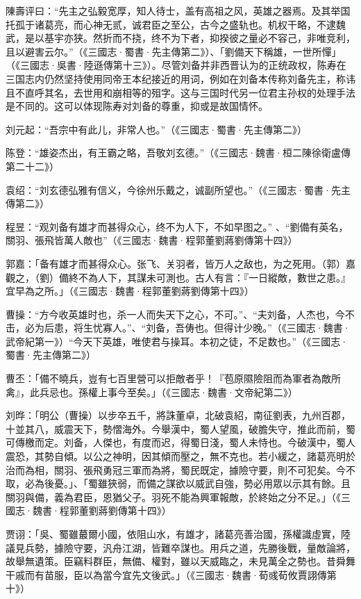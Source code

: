 陳壽评曰：“先主之弘毅宽厚，知人待士，盖有高祖之风，英雄之器焉。及其举国托孤于诸葛亮，而心神无贰，诚君臣之至公，古今之盛轨也。机权干略，不逮魏武，是以基宇亦狭。然折而不挠，终不为下者，抑揆彼之量必不容己，非唯竞利，且以避害云尔。”（《三國志·蜀書·先主傳第二》）、「劉備天下稱雄，一世所憚」（《三國志·吳書·陸遜傳第十三》）。尽管刘备并非西晋认为的正统政权，陈寿在三国志内仍然坚持使用同帝王本纪接近的用词，例如在刘备本传称刘备先主，称讳且不直呼其名，去世用和崩相等的殂字。这与三国时代另一位君主孙权的处理手法是不同的。这可以体现陈寿对刘备的尊重，抑或是故国情怀。

刘元起：“吾宗中有此儿，非常人也。”（《三國志·蜀書·先主傳第二》）

陈登：“雄姿杰出，有王霸之略，吾敬刘玄德。”（《三國志·魏書·桓二陳徐衛盧傳第二十二》）

袁绍：“刘玄德弘雅有信义，今徐州乐戴之，诚副所望也。”（《三國志·蜀書·先主傳第二》）

程昱：“观刘备有雄才而甚得众心，终不为人下，不如早图之。” 、“劉備有英名，關羽、張飛皆萬人敵也”（《三國志·魏書·程郭董劉蔣劉傳第十四》）

郭嘉：「备有雄才而甚得众心。张飞、关羽者，皆万人之敌也，为之死用。（郭）嘉觀之，（劉）備終不為人下，其謀未可測也。古人有言：『一日縱敵，數世之患。』宜早為之所。」（《三國志·魏書·程郭董劉蔣劉傳第十四》）

曹操：“方今收英雄时也，杀一人而失天下之心，不可。”、“夫刘备，人杰也，今不击，必为后患，将生忧寡人。”、“刘备，吾俦也。但得计少晚。”（《三國志·魏書·武帝紀第一》）“今天下英雄，唯使君与操耳。本初之徒，不足数也。”（《三國志·蜀書·先主傳第二》）

曹丕：「備不曉兵，豈有七百里營可以拒敵者乎！『苞原隰險阻而為軍者為敵所禽』，此兵忌也。孫權上事今至矣。」（《三國志·魏書·文帝紀第二》）

刘晔：「明公（曹操）以步卒五千，將誅董卓，北破袁紹，南征劉表，九州百郡，十並其八，威震天下，勢慴海外。今舉漢中，蜀人望風，破膽失守，推此而前，蜀可傳檄而定。刘备，人傑也，有度而迟，得蜀日淺，蜀人未恃也。今破漢中，蜀人震恐，其勢自傾。以公之神明，因其傾而壓之，無不克也。若小緩之，諸葛亮明於治而為相，關羽、張飛勇冠三軍而為將，蜀民既定，據險守要，則不可犯矣。今不取，必為後憂。」、「蜀雖狹弱，而備之謀欲以威武自強，勢必用眾以示其有餘。且關羽與備，義為君臣，恩猶父子。羽死不能為興軍報敵，於終始之分不足。」（《三國志·魏書·程郭董劉蔣劉傳第十四》）

贾诩：「吳、蜀雖蕞爾小國，依阻山水，有雄才，諸葛亮善治國，孫權識虛實，陸議見兵勢，據險守要，汎舟江湖，皆難卒謀也。用兵之道，先勝後戰，量敵論將，故舉無遺策。臣竊料群臣，無備、權對，雖以天威臨之，未見萬全之勢也。昔舜舞干戚而有苗服，臣以為當今宜先文後武。」（《三國志·魏書·荀彧荀攸賈詡傳第十》）

